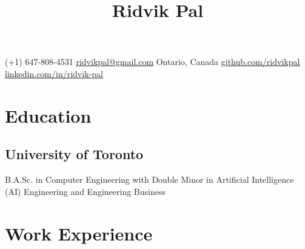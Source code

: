 \documentclass[10pt, a4paper]{article}
\begin{document}
\title{\vspace{-1.5cm}\textbf{Ridvik Pal}\vspace{-1.5cm}}
\date{}
\author{}
\maketitle
\begin{center}
    (+1) 647-808-4531
    \hfill
    \href{mailto:ridvikpal@gmail.com}{\underline{ridvikpal@gmail.com}}
    \hfill
    Ontario, Canada
    \hfill
    \href{https://github.com/ridvikpal}{\underline{github.com/ridvikpal}}
    \hfill
    \href{https://www.linkedin.com/in/ridvik-pal}{\underline{linkedin.com/in/ridvik-pal}}
\end{center}\vspace{-10pt}

\section*{Education}
\subsection*{University of Toronto\hfill {}}
\raggedright
B.A.Sc. in Computer Engineering with Double Minor in Artificial Intelligence (AI) Engineering and Engineering Business


\section*{Work Experience}

\end{document}
